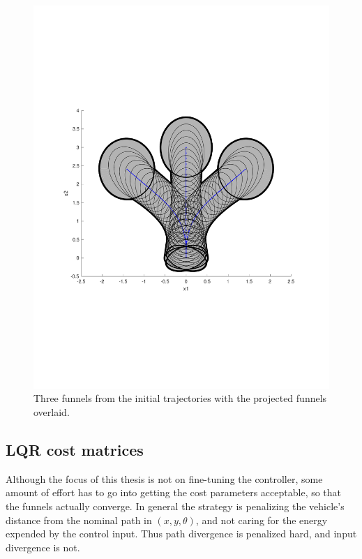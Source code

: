 \begin{figure}
  \centering
  \includegraphics[scale=.5]{figures/experiments/sample-funnel-overlay}
  \caption{Three funnels from the initial trajectories with the projected
    funnels overlaid.}
  \label{fig:sample-funnel-overlay}
\end{figure}

\subsection{LQR cost matrices}
\label{subsec:lqr-cost}

Although the focus of this thesis is not on fine-tuning the controller, some
amount of effort has to go into getting the cost parameters acceptable, so that
the funnels actually converge. In general the strategy is penalizing the
vehicle's distance from the nominal path in \((x,y,\theta)\), and not caring for
the energy expended by the control input. Thus path divergence is penalized
hard, and input divergence is not.

